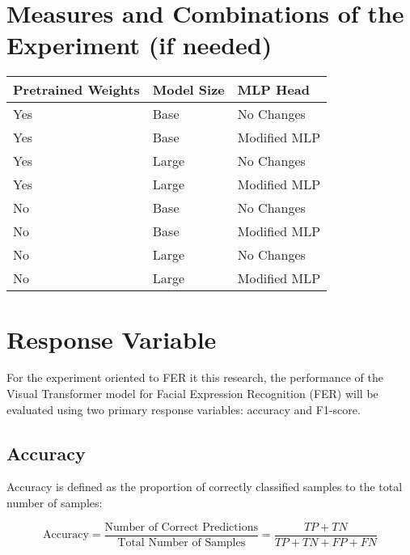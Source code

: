 \section{Measures and Combinations of the Experiment (if needed)}

\begin{table}[H]
\centering
\begin{tabular}{lll}
\hline
\textbf{Pretrained   Weights} & \textbf{Model Size} & \textbf{MLP Head} \\ \hline
Yes                           & Base                & No Changes        \\
Yes                           & Base                & Modified MLP      \\
Yes                           & Large               & No Changes        \\
Yes                           & Large               & Modified MLP      \\
No                            & Base                & No Changes        \\
No                            & Base                & Modified MLP      \\
No                            & Large               & No Changes        \\
No                            & Large               & Modified MLP      \\ \hline
\end{tabular}
\end{table}


\section{Response Variable}

For the experiment oriented to FER it  this research, the performance of the Visual Transformer model for Facial Expression Recognition (FER) will be evaluated using two primary response variables: accuracy and F1-score.

\subsection{Accuracy}\label{sub:accurracy}

Accuracy is defined as the proportion of correctly classified samples to the total number of samples:

\begin{equation}
\text{Accuracy} = \frac{\text{Number of Correct Predictions}}{\text{Total Number of Samples}} = \frac{TP + TN}{TP + TN + FP + FN}
\end{equation}

